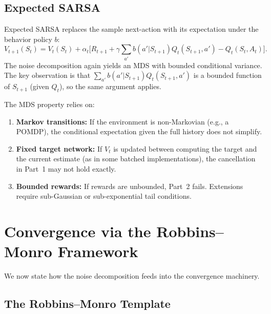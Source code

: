 \documentclass[11pt,a4paper]{article}
\begin{document}
\subsection{Expected SARSA}

Expected SARSA replaces the sample next-action with its
expectation under the behavior policy $b$:
\begin{equation}
  V_{t+1}(S_t)
  = V_t(S_t) + \alpha_t
    \bigl[R_{t+1} + \gamma \textstyle\sum_{a'}
    b(a'|S_{t+1}) Q_t(S_{t+1}, a')
    - Q_t(S_t, A_t)\bigr].
  \label{eq:expected_sarsa}
\end{equation}
The noise decomposition again yields an MDS with bounded
conditional variance.  The key observation is that
$\sum_{a'} b(a'|S_{t+1}) Q_t(S_{t+1}, a')$ is a bounded
function of $S_{t+1}$ (given $Q_t$), so the same argument
applies.

\begin{warning}[title={When the MDS Property Fails}]
The MDS property relies on:
\begin{enumerate}[nosep]
  \item \textbf{Markov transitions:} If the environment is
    non-Markovian (e.g., a POMDP), the conditional expectation
    given the full history does not simplify.
  \item \textbf{Fixed target network:} If $V_t$ is updated
    between computing the target and the current estimate
    (as in some batched implementations), the cancellation
    in Part~1 may not hold exactly.
  \item \textbf{Bounded rewards:} If rewards are unbounded,
    Part~2 fails.  Extensions require sub-Gaussian or
    sub-exponential tail conditions.
\end{enumerate}
\end{warning}


\section{Convergence via the Robbins--Monro Framework}
\label{sec:convergence}

We now state how the noise decomposition feeds into the
convergence machinery.

\subsection{The Robbins--Monro Template}
\end{document}

